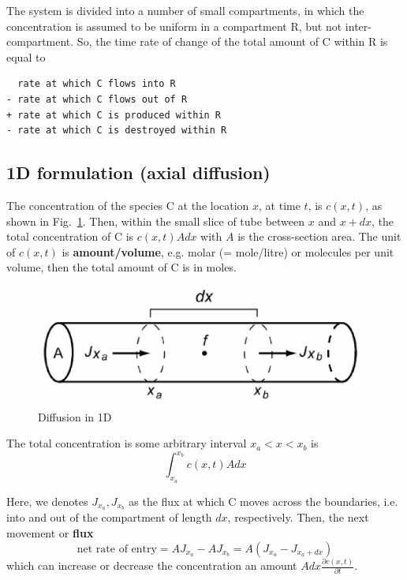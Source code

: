 The system is divided into a number of small compartments, in which
the concentration is assumed to be uniform in a compartment R, but not
inter-compartment. So, the time rate of change of the total amount of
C within R is equal to
\begin{verbatim}
  rate at which C flows into R
- rate at which C flows out of R
+ rate at which C is produced within R
- rate at which C is destroyed within R
\end{verbatim}

\subsection{1D formulation (axial diffusion)}
\label{sec:1d-formulation}
\label{sec:axial-diffusion}

The concentration of the species C at the location $x$, at time $t$, is
$c(x,t)$, as shown in Fig.~\ref{fig:diffusion_1D}. Then, within the small slice
of tube between $x$ and $x+dx$, the total concentration of C is $c(x,t)Adx$ with
$A$ is the cross-section area.
The unit of $c(x,t)$ is {\bf amount/volume}, e.g. molar (= mole/litre) or
molecules per unit volume, then the total amount of C is in moles.

\begin{figure}[hbt]
 \centerline{\includegraphics[height=4cm, angle=0]{./images/1D_diffusion.eps}}
\caption{Diffusion in 1D}
\label{fig:diffusion_1D}
\end{figure}

\begin{mdframed}
The total concentration is some arbitrary interval $x_a<x<x_b$ is
\begin{equation}
  \label{eq:797}
  \int_{x_a}^{x_b} c(x,t)Adx
\end{equation}
\end{mdframed}

Here, we denotes $J_{x_a}, J_{x_b}$ as the flux at which C moves across the
boundaries, i.e. into and out of the compartment of length $dx$, respectively.
Then, the next movement or {\bf flux}
\begin{equation}
  \label{eq:798}
 \text{net rate of entry} =  AJ_{x_a} - AJ_{x_b} = A (J_{x_a}-J_{x_a+dx})
\end{equation}
which can increase or decrease the concentration an amount
$A dx \frac{\partial c(x,t)}{\partial t}$.

